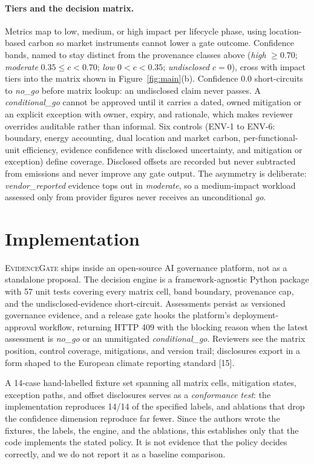 \documentclass{article}
\newcommand{\sysname}{\textsc{EvidenceGate}}
\newcommand{\platname}{an open-source AI governance platform}
\begin{document}
\paragraph{Tiers and the decision matrix.} Metrics map to low, medium, or high
impact per lifecycle phase, using location-based carbon so market instruments
cannot lower a gate outcome. Confidence bands, named to stay distinct from the
provenance classes above (\emph{high} $\geq 0.70$; \emph{moderate}
$0.35 \leq c < 0.70$; \emph{low} $0 < c < 0.35$; \emph{undisclosed} $c = 0$),
cross with impact tiers into the matrix shown in Figure~\ref{fig:main}(b). Confidence 0.0 short-circuits to \emph{no\_go} before
matrix lookup: an undisclosed claim never passes. A \emph{conditional\_go}
cannot be approved until it carries a dated, owned mitigation or an explicit
exception with owner, expiry, and rationale, which makes reviewer overrides
auditable rather than informal. Six controls (ENV-1 to ENV-6: boundary, energy
accounting, dual location and market carbon, per-functional-unit efficiency,
evidence confidence with disclosed uncertainty, and mitigation or exception)
define coverage. Disclosed offsets are recorded but never subtracted from
emissions and never improve any gate output. The asymmetry is deliberate:
\emph{vendor\_reported} evidence tops out in \emph{moderate}, so a
medium-impact workload assessed only from provider figures never receives an
unconditional \emph{go}.

\section{Implementation}

\sysname{} ships inside \platname, not as a standalone proposal. The decision
engine is a framework-agnostic Python package with 57 unit tests covering every
matrix cell, band boundary, provenance cap, and the undisclosed-evidence
short-circuit. Assessments persist as versioned governance evidence, and a
release gate hooks the platform's deployment-approval workflow, returning HTTP
409 with the blocking reason when the latest assessment is \emph{no\_go} or an
unmitigated \emph{conditional\_go}. Reviewers see the matrix position, control
coverage, mitigations, and version trail; disclosures export in a form shaped
to the European climate reporting standard [15].

A 14-case hand-labelled fixture set spanning all matrix cells, mitigation
states, exception paths, and offset disclosures serves as a \emph{conformance
test}: the implementation reproduces 14/14 of the specified labels, and
ablations that drop the confidence dimension reproduce far fewer. Since the
authors wrote the fixtures, the labels, the engine, and the ablations, this
establishes only that the code implements the stated policy. It is not
evidence that the policy decides correctly, and we do not report it as a
baseline comparison.
\end{document}
